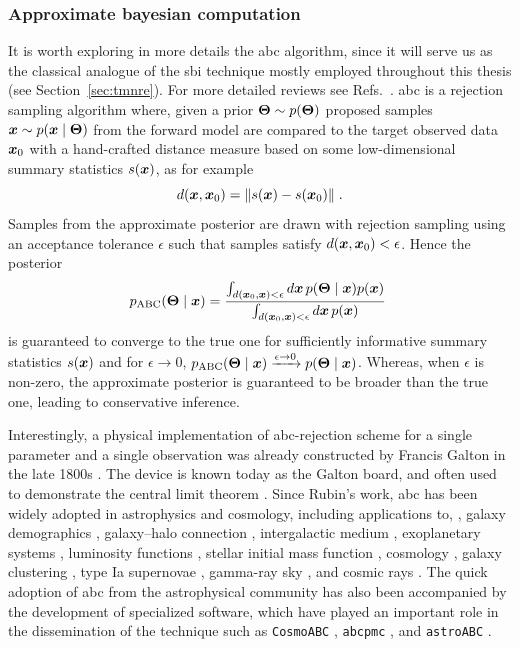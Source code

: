 \subsubsection{Approximate bayesian computation}

It is worth exploring in more details the \gls*{abc} algorithm, since it will serve us as the classical analogue of the \gls*{sbi} technique mostly employed throughout this thesis (see Section~\ref{sec:tmnre}). For more detailed reviews see Refs.~\cite{marin2012approximate, Sisson:2018aa, Grazian:2019aa}. \Gls*{abc} is a rejection sampling algorithm where, given a prior $\bm{\Theta}\sim p(\bm{\Theta})$ proposed samples $\bm{x} \sim p(\bm{x}\mid\bm{\Theta})$ from the forward model are compared to the target observed data $\bm{x}_0$ with a hand-crafted distance measure based on some low-dimensional summary statistics $s(\bm{x})$, as for example
\begin{equation}
    d(\bm{x}, \bm{x}_0)  = \| s(\bm{x}) - s(\bm{x}_0)\|\;.
\end{equation}
Samples from the approximate posterior are drawn with rejection sampling using an acceptance tolerance $\epsilon$ such that samples satisfy $d(\bm{x}, \bm{x}_0) < \epsilon$.
Hence the posterior
\begin{equation}
    p_\text{ABC}(\bm{\Theta}\mid\bm{x}) = \frac
    {\int_{d(\bm{x}_0, \bm{x}) < \epsilon} d\bm{x}\, p(\bm{\Theta}\mid\bm{x})p(\bm{x})}
    {\int_{d(\bm{x}_0, \bm{x}) < \epsilon} d\bm{x}\, p(\bm{x})} \;
\end{equation}
is guaranteed to converge to the true one for sufficiently informative summary statistics $s(\bm{x})$ and for $\epsilon \to 0$, $p_\text{ABC}(\bm{\Theta}\mid\bm{x}) \xrightarrow{\epsilon \to 0} p(\bm{\Theta}\mid\bm{x})$. Whereas, when $\epsilon$ is non-zero, the approximate posterior is guaranteed to be broader than the true one, leading to conservative inference. 

Interestingly, a physical implementation of \gls*{abc}-rejection scheme for a single parameter and a single observation was already constructed by Francis Galton in the late 1800s \cite[Figure 5]{stigler2010darwin}. The device is known today as the Galton board, and often used to demonstrate the central limit theorem \cite{galton1889natural}. Since Rubin's work, \gls*{abc} has been widely adopted in astrophysics and cosmology, including applications to, \eg, galaxy demographics \cite{cameron2012approximate}, galaxy–halo connection \cite{hahn2017approximate}, intergalactic medium \cite{Davies:2017eir}, exoplanetary systems \cite{hsu2018improving}, luminosity functions \cite{Riechers:2018zjg}, stellar initial mass function \cite{cisewski2019preferential}, cosmology \cite{Akeret:2015uha, jennings2017astroabc}, galaxy clustering \cite{Ishida:2015wla}, type Ia supernovae \cite{Weyant:2012xe}, gamma-ray sky \cite{Baxter:2021tui}, and cosmic rays \cite{bourriche2024beyond}. The quick adoption of \gls*{abc} from the astrophysical community has also been accompanied by the development of specialized software, which have played an important role in the dissemination of the technique such as \texttt{CosmoABC} \cite{Ishida:2015wla}, \texttt{abcpmc} \cite{Akeret:2015uha}, and \texttt{astroABC} \cite{jennings2017astroabc}.


